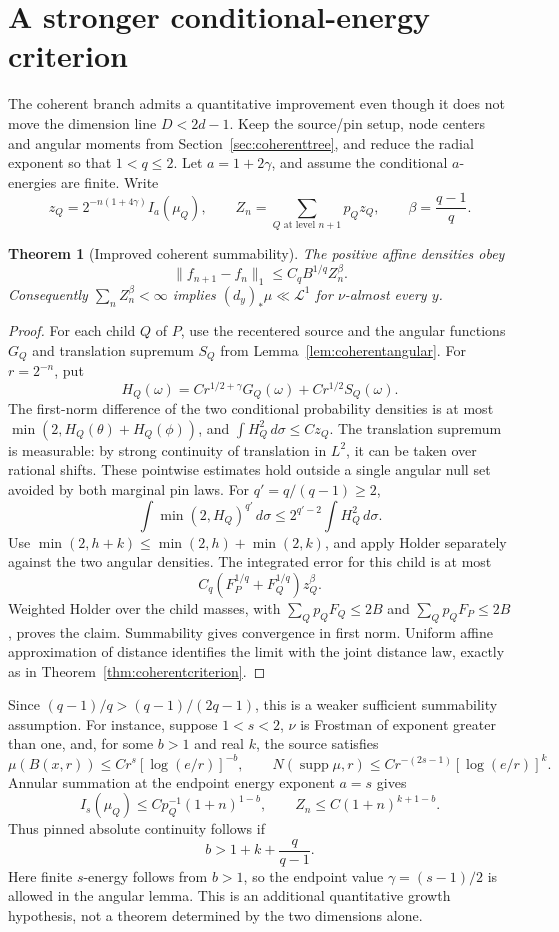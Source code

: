 \documentclass[11pt]{article}
\newtheorem{theorem}{Theorem}[section]
\theoremstyle{definition}\newtheorem{remark}[theorem]{Remark}
\newcommand{\supp}{\operatorname{supp}}\newcommand{\dist}{\operatorname{dist}}
\newcommand{\dd}{\,d}\newcommand{\norm}[1]{\left\|#1\right\|}\newcommand{\eps}{\varepsilon}
\begin{document}
\section{A stronger conditional-energy criterion}
The coherent branch admits a quantitative improvement even though it does not
move the dimension line \(D<2d-1\).
Keep the source/pin setup, node centers and angular moments from Section~\ref{sec:coherenttree},
and reduce the radial exponent so that \(1<q\le2\).
Let \(a=1+2\gamma\), and assume the conditional \(a\)-energies are finite.
Write
$$
 z_Q=2^{-n(1+4\gamma)}I_a(\mu_Q),\qquad
 Z_n=\sum_{Q\text{ at level }n+1}p_Qz_Q,\qquad
 \beta=\frac{q-1}{q}.
$$
\begin{theorem}[Improved coherent summability]
The positive affine densities obey
$$
 \|f_{n+1}-f_n\|_1\le C_q B^{1/q}Z_n^\beta.
$$
Consequently \(\sum_n Z_n^\beta<\infty\) implies
\((d_y)_*\mu\ll\mathcal L^1\) for \(\nu\)-almost every \(y\).
\end{theorem}
\begin{proof}
For each child \(Q\) of \(P\), use the recentered source and the angular functions
\(G_Q\) and translation supremum \(S_Q\) from Lemma~\ref{lem:coherentangular}.
For \(r=2^{-n}\), put
$$
 H_Q(\omega)=C r^{1/2+\gamma}G_Q(\omega)+C r^{1/2}S_Q(\omega).
$$
The first-norm difference of the two conditional probability densities is at most
\(\min(2,H_Q(\theta)+H_Q(\phi))\), and \(\int H_Q^2\dd\sigma\le C z_Q\).
The translation supremum is measurable: by strong continuity of translation in
\(L^2\), it can be taken over rational shifts. These pointwise estimates hold
outside a single angular null set avoided by both marginal pin laws.
For \(q'=q/(q-1)\ge2\),
$$
 \int\min(2,H_Q)^{q'}\dd\sigma\le2^{q'-2}\int H_Q^2\dd\sigma.
$$
Use \(\min(2,h+k)\le\min(2,h)+\min(2,k)\), and apply Holder separately against
the two angular densities. The integrated error for this child is at most
$$
 C_q(F_P^{1/q}+F_Q^{1/q})z_Q^\beta.
$$
Weighted Holder over the child masses, with
\(\sum_Qp_QF_Q\le2B\) and \(\sum_Qp_QF_P\le2B\), proves the claim.
Summability gives convergence in first norm. Uniform affine approximation of distance
identifies the limit with the joint distance law, exactly as in
Theorem~\ref{thm:coherentcriterion}.
\end{proof}
Since \((q-1)/q>(q-1)/(2q-1)\), this is a weaker sufficient summability assumption.
For instance, suppose \(1<s<2\), \(\nu\) is Frostman of exponent greater than one,
and, for some \(b>1\) and real \(k\), the source satisfies
$$
 \mu(B(x,r))\le C r^s[\log(e/r)]^{-b},\qquad
 N(\supp\mu,r)\le C r^{-(2s-1)}[\log(e/r)]^k.
$$
Annular summation at the endpoint energy exponent \(a=s\) gives
$$
 I_s(\mu_Q)\le C p_Q^{-1}(1+n)^{1-b},\qquad
 Z_n\le C(1+n)^{k+1-b}.
$$
Thus pinned absolute continuity follows if
$$
 b>1+k+\frac q{q-1}.
$$
Here finite \(s\)-energy follows from \(b>1\), so the endpoint value
\(\gamma=(s-1)/2\) is allowed in the angular lemma. This is an additional
quantitative growth hypothesis, not a theorem determined by the two dimensions alone.
\end{document}
